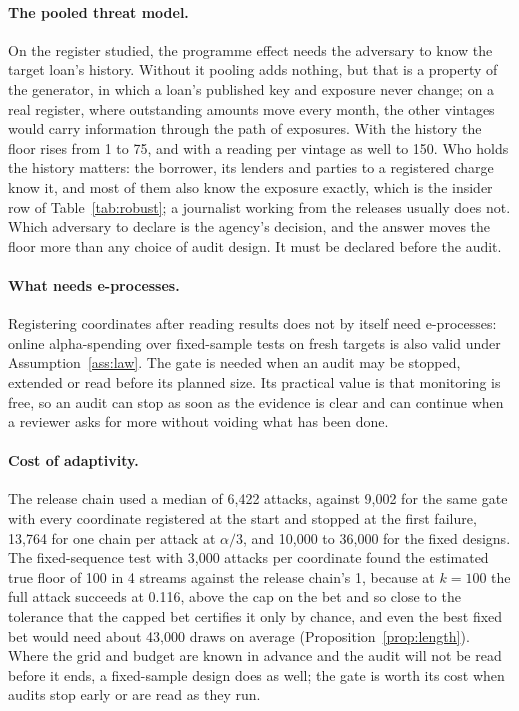 \documentclass{jpc}
\theoremstyle{remark}
\begin{document}
\paragraph{The pooled threat model.} On the register studied, the programme effect needs the adversary to know the target loan's history. Without it pooling adds nothing, but that is a property of the generator, in which a loan's published key and exposure never change; on a real register, where outstanding amounts move every month, the other vintages would carry information through the path of exposures. With the history the floor rises from 1 to 75, and with a reading per vintage as well to 150. Who holds the history matters: the borrower, its lenders and parties to a registered charge know it, and most of them also know the exposure exactly, which is the insider row of Table~\ref{tab:robust}; a journalist working from the releases usually does not. Which adversary to declare is the agency's decision, and the answer moves the floor more than any choice of audit design. It must be declared before the audit.

\paragraph{What needs e-processes.} Registering coordinates after reading results does not by itself need e-processes: online alpha-spending over fixed-sample tests on fresh targets is also valid under Assumption~\ref{ass:law}. The gate is needed when an audit may be stopped, extended or read before its planned size. Its practical value is that monitoring is free, so an audit can stop as soon as the evidence is clear and can continue when a reviewer asks for more without voiding what has been done.

\paragraph{Cost of adaptivity.} The release chain used a median of 6{,}422 attacks, against 9{,}002 for the same gate with every coordinate registered at the start and stopped at the first failure, 13{,}764 for one chain per attack at $\alpha/3$, and 10{,}000 to 36{,}000 for the fixed designs. The fixed-sequence test with 3{,}000 attacks per coordinate found the estimated true floor of 100 in 4 streams against the release chain's 1, because at $k=100$ the full attack succeeds at 0.116, above the cap on the bet and so close to the tolerance that the capped bet certifies it only by chance, and even the best fixed bet would need about 43{,}000 draws on average (Proposition~\ref{prop:length}). Where the grid and budget are known in advance and the audit will not be read before it ends, a fixed-sample design does as well; the gate is worth its cost when audits stop early or are read as they run.
\end{document}
